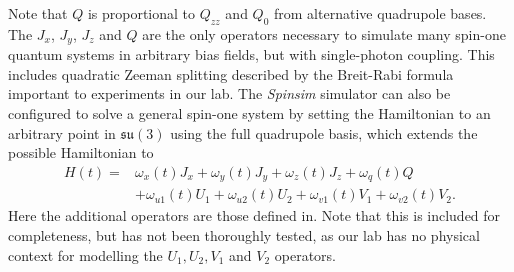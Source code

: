 \documentclass{jors}
\begin{document}
		Note that $ Q $ is proportional to $ Q_{zz} $\cite{hamley_spin-nematic_2012} and $ Q_0 $\cite{di_dipolequadrupole_2010} from alternative quadrupole bases.
		The $ J_x $, $ J_y $, $ J_z $ and $ Q $ are the only operators necessary to simulate many spin-one quantum systems in arbitrary bias fields, but with single-photon coupling.
		This includes quadratic Zeeman splitting described by the Breit-Rabi formula\cite{mockler_atomic_1961} important to experiments in our lab.
		The \emph{Spinsim} simulator can also be configured to solve a general spin-one system by setting the Hamiltonian to an arbitrary point in $ \mathfrak{su}(3) $ using the full quadrupole basis, which extends the possible Hamiltonian to
		\begin{align}
			H(t) =& \omega_x(t) J_x + \omega_y(t) J_y + \omega_z(t) J_z + \omega_q(t) Q\nonumber\\
			&+ \omega_{u1}(t) U_1 + \omega_{u2}(t) U_2 + \omega_{v1}(t) V_1 + \omega_{v2}(t) V_2.
		\end{align}
		Here the additional operators are those defined in\cite{di_dipolequadrupole_2010}. Note that this is included for completeness, but has not been thoroughly tested, as our lab has no physical context for modelling the $ U_1, U_2, V_1 $ and $ V_2 $ operators.



		



\end{document}
